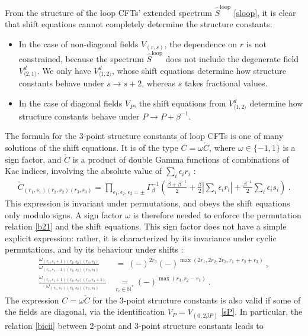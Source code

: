 \documentclass[12pt, a4paper]{article}
\begin{document}
From the structure of the loop CFTs' extended spectrum $\widehat{S}^\text{loop}$ \eqref{sloop}, it is clear that shift equations cannot completely determine the structure constants:
\begin{itemize}
 \item In the case of non-diagonal fields $V_{(r,s)}$, the dependence on $r$ is not constrained, because the spectrum $\widehat{S}^\text{loop}$ does not include the degenerate field $V_{\langle 2,1\rangle}^d$. We only have $V^d_{\langle 1,2\rangle}$, whose shift equations determine how structure constants behave under $s\to s+2$, whereas $s$ takes fractional values.
 \item In the case of diagonal fields $V_P$, the shift equations from $V^d_{\langle 1,2\rangle}$ determine how structure constants behave under $P\to P+\beta^{-1}$. 
\end{itemize}
The formula for the 3-point structure constants of loop CFTs is one of many solutions of the shift equations. It is of the type $C=\omega \check C$, where $\omega\in \{-1,1\}$ is a sign factor, and $\check C$ is
a product of double Gamma functions of combinations of Kac indices, involving the absolute value of $\sum_i\epsilon_i r_i$ \cite{nrj23, jnrr25}:
\begin{align}
\boxed{\check{C}_{(r_1,s_1)(r_2,s_2)(r_3,s_3)} =\prod_{\epsilon_1,\epsilon_2,\epsilon_3=\pm} \Gamma_\beta^{-1} \left(\tfrac{\beta+\beta^{-1}}{2} + \tfrac{\beta}{2}\left|\textstyle{\sum_i} \epsilon_ir_i\right| + \tfrac{\beta^{-1}}{2}\textstyle{\sum_i} \epsilon_is_i\right)}\ .
 \label{cref}
\end{align}
This expression is invariant under permutations, and obeys the shift equations only modulo signs. A sign factor $\omega$ is therefore needed to enforce the permutation relation \eqref{b21} and the shift equations. This sign factor does not have a simple explicit expression: rather, it is characterized by its invariance under cyclic permutations, and by its behaviour under shifts \cite{nrj23}:
\begin{align}
 \frac{\omega_{(r_1,s_1+1)(r_2,s_2)(r_3,s_3)}}{\omega_{(r_1,s_1-1)(r_2,s_2)(r_3,s_3)}} &\ =\  (-)^{2r_3}(-)^{\max(2r_1, 2r_2, 2r_3,r_1+r_2+r_3)} \ ,
 \label{tpt}
 \\
 \frac{\omega_{(r_1,s_1+1)(r_2,s_2)(r_3,s_3+1)}}{\omega_{(r_1,s_1)(r_2,s_2)(r_3,s_3)}} &\underset{r_i\in\mathbb{N}^*}{=}
 (-)^{\max(r_3, r_2-r_1)}\ .
\label{tppt}
\end{align}
The expression $C=\omega \check{C}$ for the 3-point structure constants is also valid if some of the fields are diagonal, via the identification $V_P = V_{(0,2\beta P)}$ \eqref{sP}. In particular, the relation \eqref{bicii} between 2-point and 3-point structure constants leads to
\end{document}
